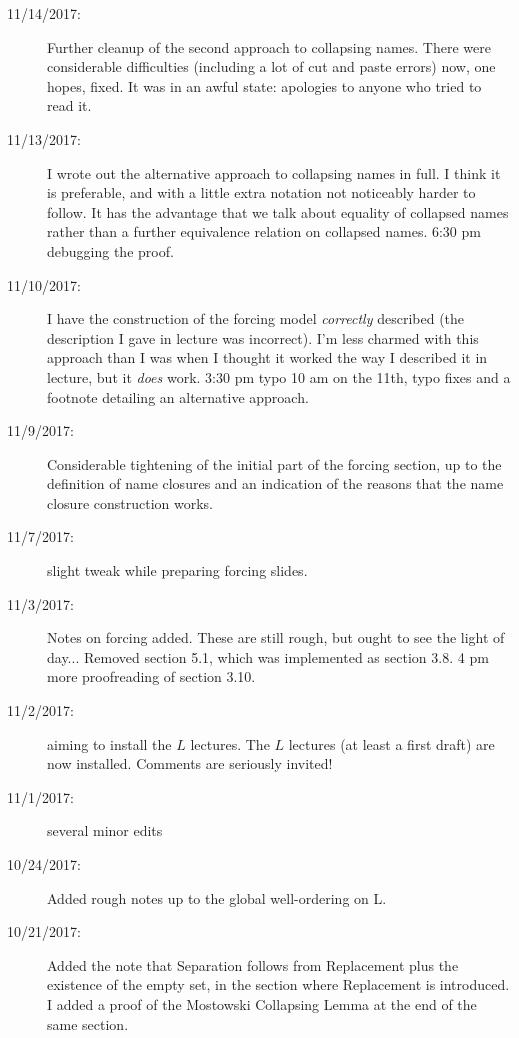 \documentclass[12pt]{book}
\begin{document}
{\begin{description}
\item[11/14/2017:]  Further cleanup of the second approach to collapsing names.  There were considerable difficulties (including a lot of cut and paste errors) now, one hopes, fixed.  It was in an awful state:  apologies to anyone who tried to read it.

\item[11/13/2017:]  I wrote out the alternative approach to collapsing names in full.  I think it is preferable, and with a little extra notation not noticeably harder to follow.  It has the advantage that we talk about equality of collapsed names rather than a further equivalence relation on collapsed names.  6:30 pm debugging the  proof.

\item[11/10/2017:]  I have the construction of the forcing model {\em correctly\/} described (the description I gave in lecture was incorrect).  I'm less charmed with this approach than I was when I thought it worked the way I described it in lecture, but it {\em does\/} work.  3:30 pm typo  10 am on the 11th, typo fixes and a footnote detailing an alternative approach.

\item[11/9/2017:]  Considerable tightening of the initial part of the forcing section, up to the definition of name closures and an indication of the reasons that the name closure construction works.

\item[11/7/2017:]  slight tweak while preparing forcing slides.

\item[11/3/2017:]  Notes on forcing added.  These are still rough, but ought to see the light of day...  Removed section 5.1, which was implemented as section 3.8. 4 pm more proofreading of section 3.10.

\item[11/2/2017:]  aiming to install the $L$ lectures.  The $L$ lectures (at least a first draft) are now installed.  Comments are seriously invited!

\item[11/1/2017:]  several minor edits

\item[10/24/2017:]  Added rough notes up to the global well-ordering on L.

\item[10/21/2017:]  Added the note that Separation follows from Replacement plus the existence of the empty set, in the section where Replacement is introduced.  I added a proof of the Mostowski Collapsing Lemma at the end of the same section.


\end{description}}
\end{document}
